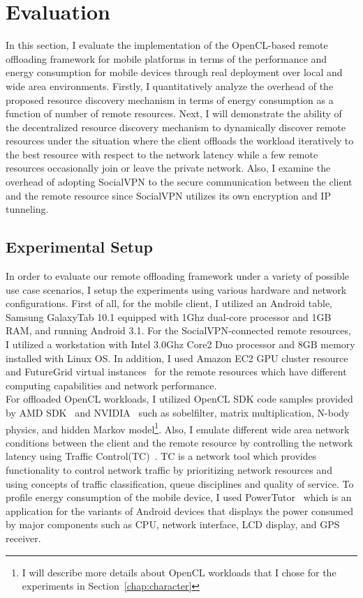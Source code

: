 \section{Evaluation}
\label{offloading:evaluation}
%
In this section, I evaluate the implementation of the OpenCL-based
remote offloading framework for mobile platforms in terms of the
performance and energy consumption for mobile devices through real
deployment over local and wide area environments.
%
Firstly, I quantitatively analyze the overhead of the proposed resource
discovery mechanism in terms of energy consumption as a function of
number of remote resources.
%
Next, I will demonstrate the ability of the decentralized resource
discovery mechanism to dynamically discover remote resources under the
situation where the client offloads the workload iteratively to the best
resource with respect to the network latency while a few remote
resources occasionally join or leave the private network.
%
Also, I examine the overhead of adopting SocialVPN to the secure
communication between the client and the remote resource since SocialVPN
utilizes its own encryption and IP tunneling.
%
\subsection{Experimental Setup}
\label{offloading:setup}
In order to evaluate our remote offloading framework under a variety of
possible use case scenarios, I setup the experiments using various
hardware and network configurations.
%
First of all, for the mobile client, I utilized an Android table,
Samsung GalaxyTab 10.1 equipped with 1Ghz dual-core processor and 1GB
RAM, and running Android 3.1.
%
For the SocialVPN-connected remote resources, I utilized a workstation
with Intel 3.0Ghz Core2 Duo processor and 8GB memory installed with
Linux OS.
%
In addition, I used Amazon EC2 GPU cluster resource~\cite{amazonec2} and
FutureGrid virtual instances~\cite{futuregrid} for the remote resources which have
different computing capabilities and network performance.\\
%
For offloaded OpenCL workloads, I utilized OpenCL SDK code samples
provided by AMD SDK~\cite{amd} and NVIDIA~\cite{nvidia} such as
sobelfilter, matrix multiplication, N-body physics,
and hidden Markov model\footnote{I will describe more details about
OpenCL workloads that I chose for the experiments in
Section~\ref{chap:character}}.
%
Also, I emulate different wide area network conditions between the
client and the remote resource by controlling the network latency using
Traffic Control(TC)~\cite{tc}.
%
TC is a network tool which  provides functionality to control network
traffic by prioritizing network resources and using concepts of traffic
classification, queue disciplines and quality of service.
%
To profile energy consumption of the mobile device, I used
PowerTutor~\cite{powertutor} which is an application for the variants of
Android devices that displays the power consumed by major components
such as CPU, network interface, LCD display, and GPS receiver.
% 
